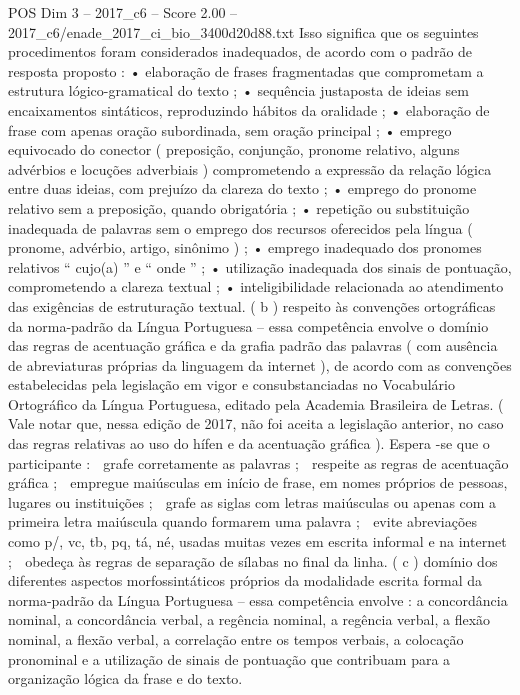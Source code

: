 \begin{textsample}{POS Dim 3 – 2017\_c6 – Score 2.00 – 2017\_c6/enade\_2017\_ci\_bio\_3400d20d88.txt}
Isso significa que os seguintes procedimentos foram considerados inadequados, de acordo com o padrão de resposta proposto : • elaboração de frases fragmentadas que comprometam a estrutura lógico-gramatical do texto ; • sequência justaposta de ideias sem encaixamentos sintáticos, reproduzindo hábitos da oralidade ; • elaboração de frase com apenas oração subordinada, sem oração principal ; • emprego equivocado do conector ( preposição, conjunção, pronome relativo, alguns advérbios e locuções adverbiais ) comprometendo a expressão da relação lógica entre duas ideias, com prejuízo da clareza do texto ; • emprego do pronome relativo sem a preposição, quando obrigatória ; • repetição ou substituição inadequada de palavras sem o emprego dos recursos oferecidos pela língua ( pronome, advérbio, artigo, sinônimo ) ; • emprego inadequado dos pronomes relativos “ cujo(a) ” e “ onde ” ; • utilização inadequada dos sinais de pontuação, comprometendo a clareza textual ; • inteligibilidade relacionada ao atendimento das exigências de estruturação textual. ( b ) respeito às convenções ortográficas da norma-padrão da Língua Portuguesa – essa competência envolve o domínio das regras de acentuação gráfica e da grafia padrão das palavras ( com ausência de abreviaturas próprias da linguagem da internet ), de acordo com as convenções estabelecidas pela legislação em vigor e consubstanciadas no Vocabulário Ortográfico da Língua Portuguesa, editado pela Academia Brasileira de Letras. ( Vale notar que, nessa edição de 2017, não foi aceita a legislação anterior, no caso das regras relativas ao uso do hífen e da acentuação gráfica ).
Espera -se que o participante :  grafe corretamente as palavras ;  respeite as regras de acentuação gráfica ;  empregue maiúsculas em início de frase, em nomes próprios de pessoas, lugares ou instituições ;  grafe as siglas com letras maiúsculas ou apenas com a primeira letra maiúscula quando formarem uma palavra ;  evite abreviações como p/, vc, tb, pq, tá, né, usadas muitas vezes em escrita informal e na internet ;  obedeça às regras de separação de sílabas no final da linha. ( c ) domínio dos diferentes aspectos morfossintáticos próprios da modalidade escrita formal da norma-padrão da Língua Portuguesa – essa competência envolve : a concordância nominal, a concordância verbal, a regência nominal, a regência verbal, a flexão nominal, a flexão verbal, a correlação entre os tempos verbais, a colocação pronominal e a utilização de sinais de pontuação que contribuam para a organização lógica da frase e do texto.

\end{textsample}
